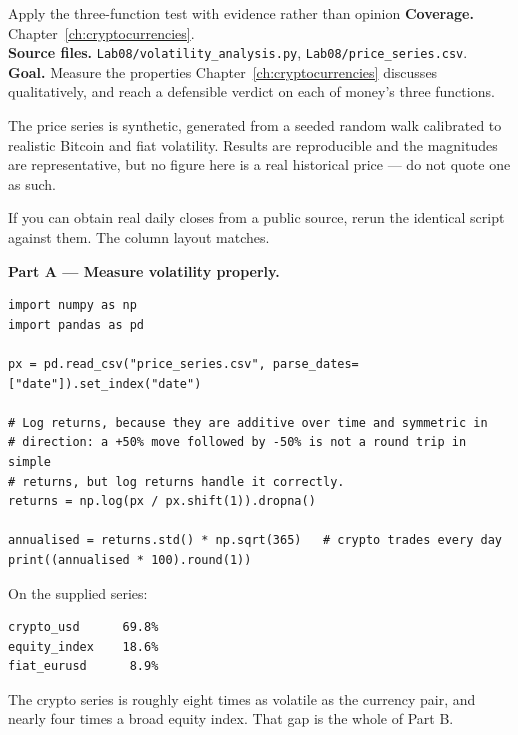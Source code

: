 
\begin{labproject}{Apply the three-function test with evidence rather than opinion}
\textbf{Coverage.} Chapter~\ref{ch:cryptocurrencies}.\\
\textbf{Source files.} \texttt{Lab08/volatility\_analysis.py}, \texttt{Lab08/price\_series.csv}.\\
\textbf{Goal.} Measure the properties Chapter~\ref{ch:cryptocurrencies} discusses qualitatively, and reach a defensible verdict on each of money's three functions.

\begin{labmode}
The price series is synthetic, generated from a seeded random walk calibrated to realistic Bitcoin and fiat volatility. Results are reproducible and the magnitudes are representative, but no figure here is a real historical price --- do not quote one as such.

If you can obtain real daily closes from a public source, rerun the identical script against them. The column layout matches.
\end{labmode}

\medskip\noindent\textbf{Part A --- Measure volatility properly.}\par

\begin{lstlisting}[style=mlpython]
import numpy as np
import pandas as pd

px = pd.read_csv("price_series.csv", parse_dates=["date"]).set_index("date")

# Log returns, because they are additive over time and symmetric in
# direction: a +50% move followed by -50% is not a round trip in simple
# returns, but log returns handle it correctly.
returns = np.log(px / px.shift(1)).dropna()

annualised = returns.std() * np.sqrt(365)   # crypto trades every day
print((annualised * 100).round(1))
\end{lstlisting}

On the supplied series:

\begin{lstlisting}[style=mlterminal]
crypto_usd      69.8%
equity_index    18.6%
fiat_eurusd      8.9%
\end{lstlisting}

The crypto series is roughly eight times as volatile as the currency pair, and nearly four times a broad equity index. That gap is the whole of Part B.


\end{labproject}
